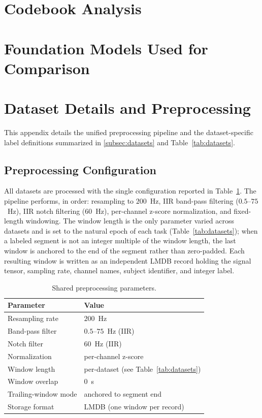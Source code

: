 \documentclass{article}
\begin{document}
\newpage
\appendix
\onecolumn

\section{Codebook Analysis}


\section{Foundation Models Used for Comparison}



\section{Dataset Details and Preprocessing}
\label{app:dataset_details}

This appendix details the unified preprocessing pipeline and the dataset-specific label definitions summarized in \cref{subsec:datasets} and Table~\ref{tab:datasets}.

\subsection{Preprocessing Configuration}

All datasets are processed with the single configuration reported in Table~\ref{tab:preproc_params}.
The pipeline performs, in order: resampling to $200$~Hz, IIR band-pass filtering ($0.5$--$75$~Hz), IIR notch filtering ($60$~Hz), per-channel z-score normalization, and fixed-length windowing.
The window length is the only parameter varied across datasets and is set to the natural epoch of each task (Table~\ref{tab:datasets}); when a labeled segment is not an integer multiple of the window length, the last window is anchored to the end of the segment rather than zero-padded.
Each resulting window is written as an independent LMDB record holding the signal tensor, sampling rate, channel names, subject identifier, and integer label.

\begin{table}[H]
  \centering
  \caption{Shared preprocessing parameters.}
  \label{tab:preproc_params}
  \small
  \begin{tabular}{ll}
    \toprule
    \textbf{Parameter} & \textbf{Value} \\
    \midrule
    Resampling rate        & $200$~Hz \\
    Band-pass filter       & $0.5$--$75$~Hz (IIR) \\
    Notch filter           & $60$~Hz (IIR) \\
    Normalization          & per-channel z-score \\
    Window length          & per-dataset (see Table~\ref{tab:datasets}) \\
    Window overlap         & $0$~s \\
    Trailing-window mode    & anchored to segment end \\
    Storage format         & LMDB (one window per record) \\
    \bottomrule
  \end{tabular}
\end{table}
\end{document}
